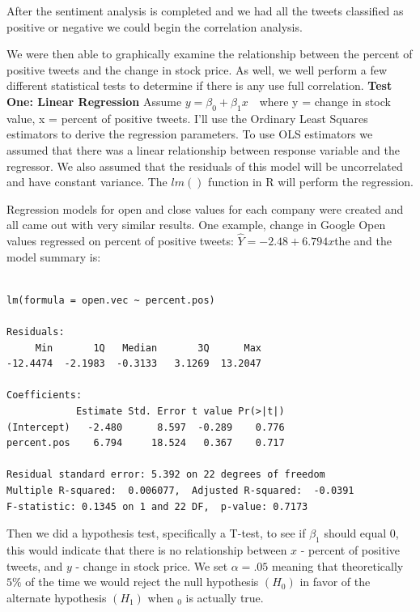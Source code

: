 \documentclass{acm_proc_article-sp}
\begin{document}
After the sentiment analysis is completed and we had all the tweets
classified as positive or negative we could begin the correlation analysis.

We were then able to graphically examine the relationship between
the percent of positive tweets and the change in stock price. As well, we well
perform a few different statistical tests to determine if there is any use full
correlation. \newline\textbf{  Test One: Linear Regression} \newline\indent
Assume $ y = \beta_0  + \beta_1x\ \ \  $ where y = change in stock value, x =
percent of positive tweets. I'll use the Ordinary Least Squares estimators to
derive the regression parameters. To use OLS estimators we assumed that
there was a linear relationship between response variable and the regressor. We
also assumed that the residuals of this model will be uncorrelated and
have constant variance. The $lm()$ function in R will perform the regression.


Regression models for open and close values for each company were created and
all came out with very similar results.  One example, change in
Google Open values regressed on percent of positive tweets: \newline\indent
$\hat{Y} = -2.48 + 6.794 x$the \newline\indent and the model summary is:

\begin{verbatim} 

lm(formula = open.vec ~ percent.pos)

Residuals:
     Min       1Q   Median       3Q      Max 
-12.4474  -2.1983  -0.3133   3.1269  13.2047 

Coefficients:
            Estimate Std. Error t value Pr(>|t|)
(Intercept)   -2.480      8.597  -0.289    0.776
percent.pos    6.794     18.524   0.367    0.717

Residual standard error: 5.392 on 22 degrees of freedom
Multiple R-squared:  0.006077,  Adjusted R-squared:  -0.0391 
F-statistic: 0.1345 on 1 and 22 DF,  p-value: 0.7173

\end{verbatim}

\indent Then we did a hypothesis test, specifically a T-test, to see if
$\beta_1$ should equal 0, this would indicate that there is no relationship
between $x$ - percent of positive tweets, and $y$ - change in stock price. We
set $\alpha = .05$ meaning that theoretically $5 \%$ of the time we
would reject the null hypothesis $ (H_0)$ in favor of the alternate hypothesis
$(H_1)$ when $ _0$ is actually true.  
\end{document}
